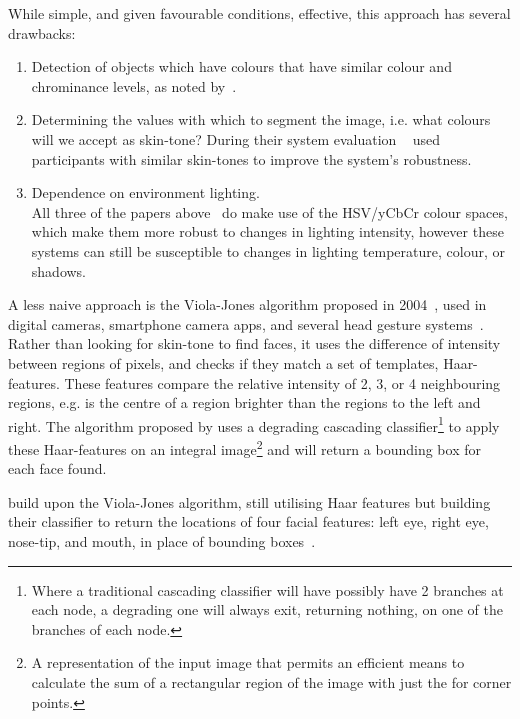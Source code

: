 While simple, and given favourable conditions, effective, this approach has several drawbacks:
\begin{enumerate}
    \item Detection of objects which have colours that have similar colour and chrominance levels, as noted by\citeauthor{bin2007rgb}~\cite{bin2007rgb}.
    \item Determining the values with which to segment the image, i.e. what colours will we accept as skin-tone? During their system evaluation \citeauthor{chan2004face}~\cite{chan2004face} used participants with similar skin-tones to improve the system's robustness.
    \item Dependence on environment lighting.\\
        All three of the papers above~\cite{huang2004robust,bin2007rgb,chan2004face} do make use of the HSV/yCbCr colour spaces, which make them more robust to changes in lighting intensity, however these systems can still be susceptible to changes in lighting temperature, colour, or shadows.
\end{enumerate}\nl
A less naive approach is the Viola-Jones algorithm proposed in 2004~\cite{viola2004robust}, used in digital cameras, smartphone camera apps, and several head gesture systems~\cite{kim2017real, neto2012real, francone2011using}.
Rather than looking for skin-tone to find faces, it uses the difference of intensity between regions of pixels, and checks if they match a set of templates, Haar-features. These features compare the relative intensity of 2, 3, or 4 neighbouring regions, e.g. is the centre of a region brighter than the regions to the left and right. 
The algorithm proposed by \citeauthor{viola2004robust} uses a degrading cascading classifier\footnote{Where a traditional cascading classifier will have possibly have 2 branches at each node, a degrading one will always exit, returning nothing, on one of the branches of each node.} to apply these Haar-features on an integral image\footnote{A representation of the input image that permits an efficient means to calculate the sum of a rectangular region of the image with just the for corner points.} and will return a bounding box for each face found.

\citeauthor{kim2017real} build upon the Viola-Jones algorithm, still utilising Haar features but building their classifier to return the locations of four facial features: left eye, right eye, nose-tip, and mouth, in place of bounding boxes~\cite{kim2017real}.

